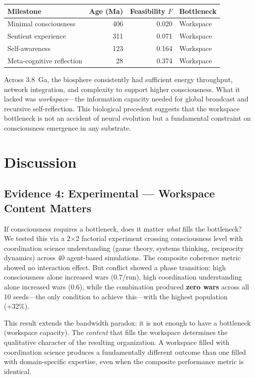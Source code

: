 \documentclass[10pt,letterpaper]{article}
\begin{document}
\begin{center}
\begin{tabular}{lrrl}
\toprule
Milestone & Age (Ma) & Feasibility $F$ & Bottleneck \\
\midrule
Minimal consciousness & 406 & 0.020 & Workspace \\
Sentient experience & 311 & 0.071 & Workspace \\
Self-awareness & 123 & 0.164 & Workspace \\
Meta-cognitive reflection & 28 & 0.374 & Workspace \\
\bottomrule
\end{tabular}
\end{center}

Across 3.8~Ga, the biosphere consistently had sufficient energy
throughput, network integration, and complexity to support higher
consciousness. What it lacked was \emph{workspace}---the information
capacity needed for global broadcast and recursive self-reflection.
This biological precedent suggests that the workspace bottleneck is
not an accident of neural evolution but a fundamental constraint on
consciousness emergence in any substrate.

\section*{Discussion}

\subsection*{Evidence 4: Experimental --- Workspace Content Matters}

If consciousness requires a bottleneck, does it matter \emph{what}
fills the bottleneck? We tested this via a 2$\times$2 factorial
experiment crossing consciousness level with coordination science
understanding (game theory, systems thinking, reciprocity dynamics)
across 40 agent-based simulations. The composite coherence metric
showed no interaction effect. But conflict showed a phase transition:
high consciousness alone increased wars (0.7/run), high coordination
understanding alone increased wars (0.6), while the combination
produced \textbf{zero wars} across all 10 seeds---the only condition
to achieve this---with the highest population (+32\%).

This result extends the bandwidth paradox: it is not enough to have a
bottleneck (workspace capacity). The \emph{content} that fills the
workspace determines the qualitative character of the resulting
organization. A workspace filled with coordination science produces
a fundamentally different outcome than one filled with domain-specific
expertise, even when the composite performance metric is identical.
\end{document}
